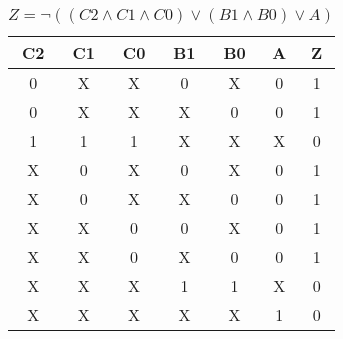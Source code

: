 
\begin{center}
    \begin{table}[h] \caption{\(Z = \lnot ((C2 \land C1 \land C0) \lor (B1 \land B0) \lor A) \)}
        \begin{center}
            \begin{tabular}{|c|c|c|c|c|c||c|} \hline
            C2 & C1 & C0 & B1 & B0 & A & Z \\ \hline\hline
            0  & X  & X  & 0  & X  & 0 & 1 \\ \hline
            0  & X  & X  & X  & 0  & 0 & 1 \\ \hline
            1  & 1  & 1  & X  & X  & X & 0 \\ \hline
            X  & 0  & X  & 0  & X  & 0 & 1 \\ \hline
            X  & 0  & X  & X  & 0  & 0 & 1 \\ \hline
            X  & X  & 0  & 0  & X  & 0 & 1 \\ \hline
            X  & X  & 0  & X  & 0  & 0 & 1 \\ \hline
            X  & X  & X  & 1  & 1  & X & 0 \\ \hline
            X  & X  & X  & X  & X  & 1 & 0 \\ \hline
            \end{tabular}
        \end{center}
    \end{table}
\end{center}

